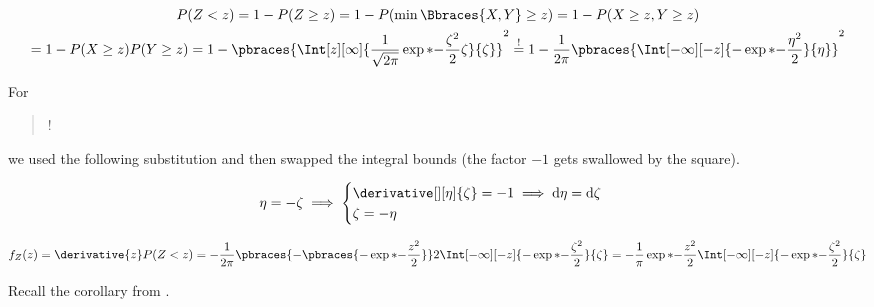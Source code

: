 \begin{solution}

\begin{multline*}
    P(Z < z)
    =
    1 - P(Z \geq z)
    =
    1 - P(\min \Bbraces{X, Y} \geq z)
    =
    1 - P(X \geq z, Y \geq z) \\
    =
    1 - P(X \geq z) P(Y \geq z)
    =
    1 - \pbraces{\Int[z][\infty]{\frac{1}{\sqrt{2 \pi}} \exp*{-\frac{\zeta^2}{2}}{\zeta}}{\zeta}}^2
    \stackrel{!}{=}
    1 - \frac{1}{2 \pi} \pbraces{\Int[-\infty][-z]{-\exp*{-\frac{\eta^2}{2}}}{\eta}}^2
\end{multline*}

For \blockquote{!} we used the following substitution and then swapped the integral bounds (the factor $-1$ gets swallowed by the square).

\begin{align*}
    \eta = -\zeta
    \implies
    \begin{cases}
        \derivative[][\eta]{\zeta} = -1 \implies \mathrm d \eta = \mathrm d \zeta \\
        \zeta = -\eta
    \end{cases}
\end{align*}

\begin{align*}
    f_Z(z)
    =
    \derivative{z}
        P(Z < z)
    =
    -\frac{1}{2 \pi}
    \pbraces
    {
        -
        \pbraces
        {
            -\exp*{-\frac{z^2}{2}}
        }
    }
    2
    \Int[-\infty][-z]
    {
        -\exp*{-\frac{\zeta^2}{2}}
    }{\zeta}
    =
    -\frac{1}{\pi}
    \exp*{-\frac{z^2}{2}}
    \Int[-\infty][-z]
    {
        -\exp*{-\frac{\zeta^2}{2}}
    }{\zeta}
\end{align*}

Recall the corollary from \cite[Lecture 3, Slide 42]{EStat}.


\end{solution}
